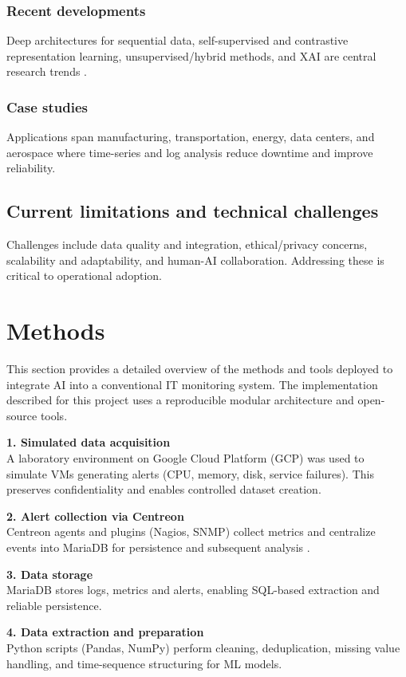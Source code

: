 \documentclass[12pt,a4paper]{article}
\begin{document}
\subsubsection*{Recent developments}
Deep architectures for sequential data, self-supervised and contrastive representation learning, unsupervised/hybrid methods, and XAI are central research trends \citep{tuli2022predictive, chalapathy2019deep, arrieta2020explainable}.

\subsubsection*{Case studies}
Applications span manufacturing, transportation, energy, data centers, and aerospace where time-series and log analysis reduce downtime and improve reliability.

\subsection{Current limitations and technical challenges}
Challenges include data quality and integration, ethical/privacy concerns, scalability and adaptability, and human-AI collaboration. Addressing these is critical to operational adoption.

\section{Methods}
This section provides a detailed overview of the methods and tools deployed to integrate AI into a conventional IT monitoring system. The implementation described for this project uses a reproducible modular architecture and open-source tools.

\textbf{1. Simulated data acquisition}\\
A laboratory environment on Google Cloud Platform (GCP) was used to simulate VMs generating alerts (CPU, memory, disk, service failures). This preserves confidentiality and enables controlled dataset creation.

\textbf{2. Alert collection via Centreon}\\
Centreon agents and plugins (Nagios, SNMP) collect metrics and centralize events into MariaDB for persistence and subsequent analysis \citep{centreon2024}.

\textbf{3. Data storage}\\
MariaDB stores logs, metrics and alerts, enabling SQL-based extraction and reliable persistence.

\textbf{4. Data extraction and preparation}\\
Python scripts (Pandas, NumPy) perform cleaning, deduplication, missing value handling, and time-sequence structuring for ML models.
\end{document}
